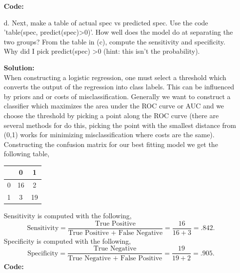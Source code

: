 \documentclass[12pt]{article}
\makeatletter
\theoremstyle{homework}
\newenvironment{exercise}[1]
{\def\@currentlabel{#1}\exercisecore}
{\endexercisecore}
\newcommand{\localhead}[1]{\par\smallskip\noindent\textbf{#1}\nobreak\\}%
\newcommand\solution{\localhead{Solution:}}
\makeatother
\begin{document}
\begin{exercise}{1}
\begin{enumerate}
  \textbf{Code:}
  \begin{center}
  
  \end{center}
  \vspace{.15in}



  \item[d.] Next, make a table of actual spec vs predicted spec. Use the code 'table(spec, predict(spec)>0)'. How well does the model do at separating
  the two groups? From the table in (c), compute the sensitivity and specificity. Why did I pick predict(spec) >0 (hint: this isn't the probability).\\
  \solution When constructing a logistic regression, one must select a threshold which converts the output of the regression into class labels. This can 
  be influenced by priors and or costs of misclassification. Generally we want to construct a classifier which maximizes the area under the ROC curve or AUC and we choose the threshold
  by picking a point along the ROC curve (there are several methods for do this, picking the point with the smallest distance from (0,1) works 
  for minimizing misclassification where costs are the same). Constructing the confusion matrix for our best fitting model we get the following table, 
  \begin{center}
    \begin{tabular}{|c||c|c| }
      \hline
       & 0 &  1 \\
      \hline 
      \hline
      0& 16 & 2 \\
      1& 3 & 19 \\
      \hline
     \end{tabular}
    \end{center}
    Sensitivity is computed with the following, 
    \begin{equation*}
      \text{Sensitivity} = \dfrac{\text{True Positive}}{\text{True Positive + False Negative}} = \dfrac{16}{16 + 3} = .842.
    \end{equation*}
    Specificity is computed with the following, 
    \begin{equation*}
      \text{Specificity} = \dfrac{\text{True Negative}}{\text{True Negative + False Positive}} = \dfrac{19}{19 + 2} = .905.
    \end{equation*}
    \textbf{Code:}
    \begin{center}
    
    \end{center}
 

  \end{enumerate}
\end{exercise}
\vspace{1in}
\end{document}
